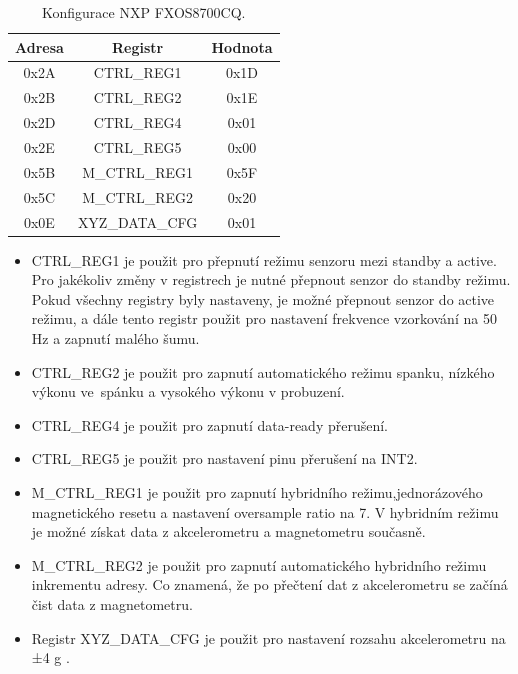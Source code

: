\begin{table}[!h]
    \centering
	\begin{tabular}{ccc}
        \hline
        \textbf{Adresa} & \textbf{Registr} & \textbf{Hodnota} \\
        \hline
        0x2A            & CTRL\_REG1       & 0x1D             \\
        0x2B            & CTRL\_REG2       & 0x1E             \\
        0x2D            & CTRL\_REG4       & 0x01             \\
        0x2E            & CTRL\_REG5       & 0x00             \\
        0x5B            & M\_CTRL\_REG1    & 0x5F             \\
        0x5C            & M\_CTRL\_REG2    & 0x20             \\
        0x0E            & XYZ\_DATA\_CFG   & 0x01             \\
        \hline
    \end{tabular}
    \caption{Konfigurace NXP FXOS8700CQ\cite{FXOS8700CQ}.}
    \label{tab:FXOS8700CQ}
\end{table}

\begin{itemize}
    \item CTRL\_REG1 je použit pro přepnutí režimu senzoru mezi standby a active.
    Pro jakékoliv změny v registrech je nutné přepnout senzor do standby režimu.
    Pokud všechny registry byly nastaveny, je možné přepnout senzor do active
    režimu, a dále tento registr použit pro nastavení frekvence vzorkování na 50 Hz
    a zapnutí malého šumu.

    \item CTRL\_REG2 je použit pro zapnutí automatického režimu spanku, nízkého
    výkonu ve~spánku a vysokého výkonu v probuzení.

    \item CTRL\_REG4 je použit pro zapnutí data-ready přerušení.

    \item CTRL\_REG5 je použit pro nastavení pinu přerušení na INT2.

    \item M\_CTRL\_REG1 je použit pro zapnutí hybridního režimu,jednorázového
    magnetického resetu a nastavení oversample ratio na 7. V hybridním režimu je
    možné získat data z akcelerometru a magnetometru současně.

    \item M\_CTRL\_REG2 je použit pro zapnutí automatického hybridního režimu
    inkrementu adresy. Co znamená, že po přečtení dat z akcelerometru se začíná čist
    data z magnetometru.

    \item Registr XYZ\_DATA\_CFG je použit pro nastavení rozsahu akcelerometru na ±4
    g \cite{FXOS8700CQ}.
\end{itemize}


